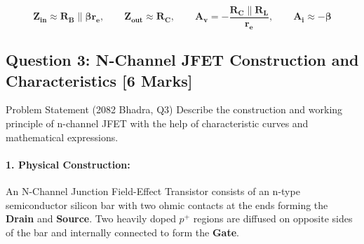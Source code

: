\documentclass[11pt,a4paper,oneside]{book}
\begin{document}
\begin{answerbox}
$$\mathbf{Z_{\text{in}} \approx R_B \parallel \beta r_e, \qquad Z_{\text{out}} \approx R_C, \qquad A_v = -\frac{R_C \parallel R_L}{r_e}, \qquad A_i \approx -\beta}$$
\end{answerbox}

\vspace{0.6cm}

\subsection{Question 3: N-Channel JFET Construction and Characteristics [6 Marks]}
\begin{questionbox}{Problem Statement (2082 Bhadra, Q3)}
Describe the construction and working principle of n-channel JFET with the help of characteristic curves and mathematical expressions.
\end{questionbox}

\paragraph{1. Physical Construction:}
An N-Channel Junction Field-Effect Transistor consists of an n-type semiconductor silicon bar with two ohmic contacts at the ends forming the \textbf{Drain} and \textbf{Source}. Two heavily doped $p^+$ regions are diffused on opposite sides of the bar and internally connected to form the \textbf{Gate}.
\end{document}
